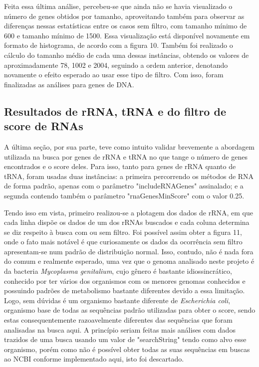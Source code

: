 \documentclass[brazilian,12pt,a4paper,final]{article}
\begin{document}
	Feita essa última análise, percebeu-se que ainda não se havia visualizado o número de genes obtidos por tamanho, aproveitando também para observar as diferenças nessas estatísticas entre os casos sem filtro, com tamanho mínimo de 600 e tamanho mínimo de 1500. Essa visualização está disponível novamente em formato de histograma, de acordo com a figura 10. Também foi realizado o cálculo do tamanho médio de cada uma dessas instâncias, obtendo os valores de aproximadamente 78, 1002 e 2004, seguindo a ordem anterior, denotando novamente o efeito esperado ao usar esse tipo de filtro. Com isso, foram finalizadas as análises para genes de DNA.
	
	\subsection{Resultados de rRNA, tRNA e do filtro de score de RNAs}
	A última seção, por sua parte, teve como intuito validar brevemente a abordagem utilizada na busca por genes de rRNA e tRNA no que tange o número de genes encontrados e o score deles. Para isso, tanto para genes de rRNA quanto de tRNA, foram usadas duas instâncias: a primeira percorrendo os métodos de RNA de forma padrão, apenas com o parâmetro "includeRNAGenes" assinalado; e a segunda contendo também o parâmetro "rnaGenesMinScore" com o valor 0.25.
	
	Tendo isso em vista, primeiro realizou-se a plotagem dos dados de rRNA, em que cada linha dispõe os dados de um dos rRNAs buscados e cada coluna determina se diz respeito à busca com ou sem filtro. Foi possível assim obter a figura 11, onde o fato mais notável é que curiosamente os dados da ocorrência sem filtro apresentam-se num padrão de distribuição normal. Isso, contudo, não é nada fora do comum e realmente esperado, uma vez que o genoma analisado neste projeto é da bacteria \textit{Mycoplasma genitalium}, cujo gênero é bastante idiossincrático, conhecido por ter vários dos organismos com os menores genomas conhecidos e possuindo padrões de metabolismo bastante diferentes devido a essa limitação. Logo, sem dúvidas é um organismo bastante diferente de \textit{Escherichia coli}, organismo base de todas as sequências padrão utilizadas para obter o score, sendo estas consequentemente razoavelmente diferentes das sequências que foram analisadas na busca aqui. A princípio seriam feitas mais análises com dados trazidos de uma busca usando um valor de "searchString" tendo como alvo esse organismo, porém como não é possível obter todas as suas sequências em buscas ao NCBI conforme implementado aqui, isto foi descartado.
	
\end{document}
